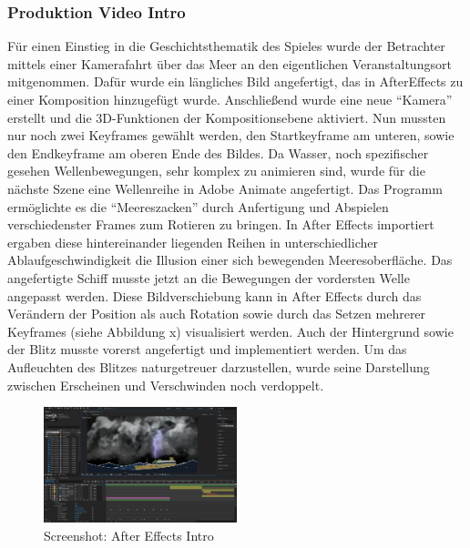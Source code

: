\subsubsection{Produktion Video Intro}
Für einen Einstieg in die Geschichtsthematik des Spieles wurde der Betrachter mittels einer Kamerafahrt über das Meer an den eigentlichen Veranstaltungsort mitgenommen.
Dafür wurde ein längliches Bild angefertigt, das in AfterEffects zu einer Komposition hinzugefügt wurde. Anschließend wurde eine neue “Kamera” erstellt und die 3D-Funktionen der Kompositionsebene aktiviert. Nun mussten nur noch zwei Keyframes gewählt werden, den Startkeyframe am unteren, sowie den Endkeyframe am oberen Ende des Bildes.
Da Wasser, noch spezifischer gesehen Wellenbewegungen, sehr komplex zu animieren sind, wurde für die nächste Szene eine Wellenreihe in Adobe Animate angefertigt. Das Programm ermöglichte es die “Meereszacken” durch Anfertigung und Abspielen verschiedenster Frames zum Rotieren zu bringen. In After Effects importiert ergaben diese hintereinander liegenden Reihen in unterschiedlicher Ablaufgeschwindigkeit die Illusion einer sich bewegenden Meeresoberfläche. 
Das angefertigte Schiff musste jetzt an die Bewegungen der vordersten Welle angepasst werden. Diese Bildverschiebung kann in After Effects durch das Verändern der Position als auch Rotation sowie durch das Setzen mehrerer Keyframes (siehe Abbildung x) visualisiert werden. Auch der Hintergrund sowie der Blitz musste vorerst angefertigt und implementiert werden. Um das Aufleuchten des Blitzes naturgetreuer darzustellen, wurde seine Darstellung zwischen Erscheinen und Verschwinden noch verdoppelt. 
\begin{figure}
\centering
\includegraphics[width=0.5\textwidth]{../img/screenshot_aftereffects_intro.PNG}
\caption{Screenshot: After Effects Intro}
\label{fig:Screenshot: After Effects Intro}
\end{figure}

